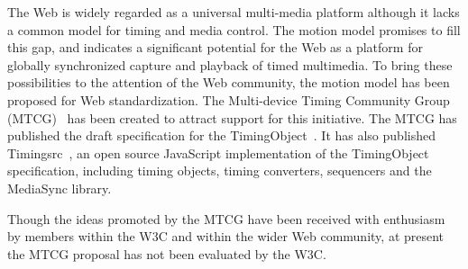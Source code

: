 The Web is widely regarded as a universal multi-media platform although it
lacks a common model for timing and media control. The motion model promises
to fill this gap, and indicates a significant potential for the Web as a
platform for globally synchronized capture and playback of timed multimedia.
To bring these possibilities to the attention of the Web community, the motion
model has been proposed for Web standardization. The Multi-device Timing
Community Group (MTCG)~\cite{mtcg} has been created to attract support for
this initiative. The MTCG has published the draft specification for the
TimingObject~\cite{timingobject}. It has also published
Timingsrc~\cite{timingsrc}, an open source JavaScript implementation of the
TimingObject specification, including timing objects, timing converters,
sequencers and the MediaSync library.

Though the ideas promoted by the MTCG have been received with enthusiasm by
members within the W3C and within the wider Web community, at present the MTCG
proposal has not been evaluated by the W3C.
